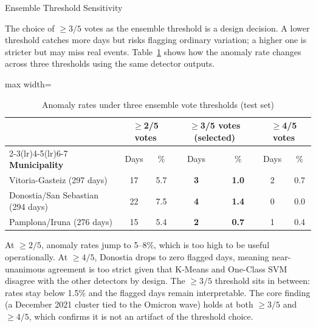 ﻿\documentclass[12pt,reqno, twoside]{amsbook}
\makeatletter
\numberwithin{figure}{chapter}
\numberwithin{table}{chapter}
\numberwithin{equation}{chapter}
\def\subsection{\@startsection{subsection}{2}%
      \z@{.5\linespacing\@plus.7\linespacing}{.25\linespacing}%
      {\normalfont\bfseries\flushleft}}
\theoremstyle{plain}
\numberwithin{equation}{chapter}
\numberwithin{section}{chapter}
\makeatother
\begin{document}
\FloatBarrier

\subsection{Ensemble Threshold Sensitivity}

The choice of $\geq 3/5$ votes as the ensemble threshold is a design decision. A lower threshold catches more days but risks flagging ordinary variation; a higher one is stricter but may miss real events. Table~\ref{tab:threshold_sensitivity} shows how the anomaly rate changes across three thresholds using the same detector outputs.

\begin{table}[htbp]
\centering
\caption{Anomaly rates under three ensemble vote thresholds (test set)}
\label{tab:threshold_sensitivity}
\begin{adjustbox}{max width=\textwidth}
\begin{tabular}{lcccccc}
\toprule
& \multicolumn{2}{c}{\textbf{$\geq$2/5 votes}} & \multicolumn{2}{c}{\textbf{$\geq$3/5 votes (selected)}} & \multicolumn{2}{c}{\textbf{$\geq$4/5 votes}} \\
\cmidrule(lr){2-3}\cmidrule(lr){4-5}\cmidrule(lr){6-7}
\textbf{Municipality} & Days & \% & Days & \% & Days & \% \\
\midrule
Vitoria-Gasteiz (297 days)        & 17 & 5.7 & \textbf{3} & \textbf{1.0} & 2 & 0.7 \\
Donostia/San Sebastian (294 days) & 22 & 7.5 & \textbf{4} & \textbf{1.4} & 0 & 0.0 \\
Pamplona/Iruna (276 days)         & 15 & 5.4 & \textbf{2} & \textbf{0.7} & 1 & 0.4 \\
\bottomrule
\end{tabular}
\end{adjustbox}
\end{table}

At $\geq 2/5$, anomaly rates jump to 5--8\%, which is too high to be useful operationally. At $\geq 4/5$, Donostia drops to zero flagged days, meaning near-unanimous agreement is too strict given that K-Means and One-Class SVM disagree with the other detectors by design. The $\geq 3/5$ threshold sits in between: rates stay below 1.5\% and the flagged days remain interpretable. The core finding (a December 2021 cluster tied to the Omicron wave) holds at both $\geq 3/5$ and $\geq 4/5$, which confirms it is not an artifact of the threshold choice.

\FloatBarrier
\end{document}
